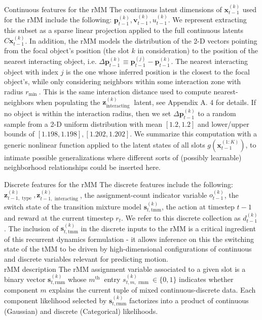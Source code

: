 \documentclass[10pt]{article}
\begin{document}
Continuous features for the rMM The continuous latent dimensions of $\mathbf{x}_{t-1}^{(k)}$ used for the rMM include the following: $\mathbf{p}_{t-1}^{(k)}, \mathbf{v}_{t-1}^{(k)}, u_{t-1}^{(k)}$. We represent extracting this subset as a sparse linear projection applied to the full continuous latents $C \mathbf{x}_{t-1}^{(k)}$. In addition, the rMM models the distribution of the 2-D vectors pointing from the focal object's position (the slot $k$ in consideration) to the position of the nearest interacting object, i.e. $\Delta \mathbf{p}_{t-1}^{(k)} \equiv \mathbf{p}_{t-1}^{(j)}-\mathbf{p}_{t-1}^{(k)}$. The nearest interacting object with index $j$ is the one whose inferred position is the closest to the focal object's, while only considering neighbors within some interaction zone with radius $r_{\text {min }}$. This is the same interaction distance used to compute nearest-neighbors when populating the $\mathbf{z}_{\text {interacting }}^{(k)}$ latent, see Appendix A. 4 for details. If no object is within the interaction radius, then we set $\Delta \mathbf{p}_{t-1}^{(k)}$ to a random sample from a 2-D uniform distribution with mean $[1.2,1.2]$ and lower/upper bounds of $[1.198,1.198],[1.202,1.202]$. We summarize this computation with a generic nonlinear function applied to the latent states of all slots $g\left(\mathbf{x}_{t-1}^{(1: K)}\right)$, to intimate possible generalizations where different sorts of (possibly learnable) neighborhood relationships could be inserted here.

Discrete features for the rMM The discrete features include the following: $\mathbf{z}_{t-1, \text { type }}^{(k)}, \mathbf{z}_{t-1, \text { interacting }}^{(k)}$, the assignment-count indicator variable $o_{t-1}^{(k)}$, the switch state of the transition mixture model $\mathbf{s}_{t, \mathrm{tmm}}^{(k)}$, the action at timestep $t-1$ and reward at the current timestep $r_{t}$. We refer to this discrete collection as $d_{t-1}^{(k)}$. The inclusion of $\mathbf{s}_{t, \mathrm{tmm}}^{(k)}$ in the discrete inputs to the rMM is a critical ingredient of this recurrent dynamics formulation - it allows inference on this the switching state of the tMM to be driven by high-dimensional configurations of continuous and discrete variables relevant for predicting motion.\\
rMM description The rMM assignment variable associated to a given slot is a binary vector $\mathbf{s}_{t, \mathrm{rmm}}^{(k)}$ whose $m^{\text {th }}$ entry $s_{t, m, \text { rmm }}^{(k)} \in\{0,1\}$ indicates whether component $m$ explains the current tuple of mixed continuous-discrete data. Each component likelihood selected by $\mathbf{s}_{t, \mathrm{rmm}}^{(k)}$ factorizes into a product of continuous (Gaussian) and discrete (Categorical) likelihoods.
\end{document}
